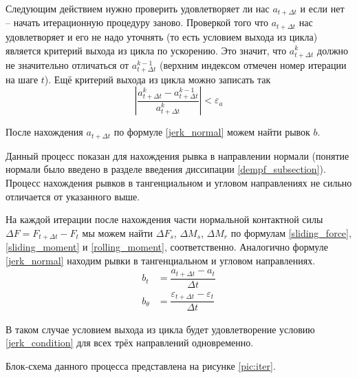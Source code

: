 \documentclass[a4paper]{article}
\begin{document}
Следующим действием нужно проверить удовлетворяет ли нас $a_{t + \Delta t}$ и если нет -- начать итерационную процедуру заново.
Проверкой того что $a_{t + \Delta t}$ нас удовлетворяет и его не надо уточнять (то есть условием выхода из цикла) является критерий выхода из цикла по ускорению.
Это значит, что $a_{t + \Delta t}^k$ должно не значительно отличаться от  $a_{t + \Delta t}^{k-1}$ (верхним индексом отмечен номер итерации на шаге $t$). 
Ещё критерий выхода из цикла можно записать так
\begin{equation}
\label{jerk_condition}
\left| \dfrac{a_{t + \Delta t}^k - a_{t + \Delta t}^{k-1}}{a_{t + \Delta t}^k} \right| < \varepsilon_a
\end{equation}

После нахождения $a_{t + \Delta t}$ по формуле \ref{jerk_normal} можем найти рывок $b$.

Данный процесс показан для нахождения рывка в направлении нормали (понятие нормали было введено в разделе введения  диссипации \ref{dempf_subsection}). 
Процесс нахождения рывков в тангенциальном и угловом направлениях не сильно отличается от указанного выше.

На каждой итерации после нахождения части нормальной контактной силы $\Delta F = F_{t+\Delta t} - F_t$  мы можем найти $\Delta F_s$, $\Delta M_s$, $\Delta M_r$ по формулам \ref{sliding_force}, \ref{sliding_moment} и \ref{rolling_moment}, соответственно.
Аналогично формуле \ref{jerk_normal} находим рывки в тангенциальном и угловом направлениях.
\begin{align}
b_t &= \dfrac{a_{t + \Delta t} - a_{t}}{\Delta t} \label{jerk_tangent}\\
b_{\theta} &= \dfrac{\varepsilon_{t + \Delta t} - \varepsilon_{t}}{\Delta t} \label{jerk_angular}
\end{align}

В таком случае условием выхода из цикла будет удовлетворение условию \ref{jerk_condition} для всех трёх направлений одновременно.

Блок-схема данного процесса представлена на рисунке \ref{pic:iter}.
\end{document}
